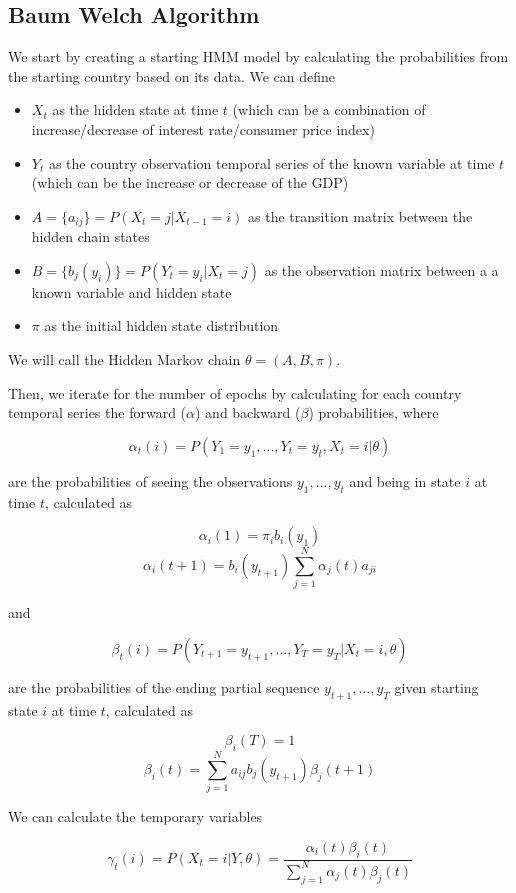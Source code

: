 \subsection*{Baum Welch Algorithm}
We start by creating a starting HMM model by calculating the probabilities from the starting country based on its data. We can define

\begin{itemize}
    \item $X_t$ as the hidden state at time $t$ (which can be a combination of increase/decrease of interest rate/consumer price index)
    \item $Y_t$ as the country observation temporal series of the known variable at time $t$ (which can be the increase or decrease of the GDP)
    \item $ A= \{a_{ij}\} = P(X_t = j | X_{t-1} = i)$ as the transition matrix between the hidden chain states
    \item $B = \{b_j(y_i)\} = P(Y_t = y_i | X_t = j)$ as the observation matrix between a a known variable and hidden state
    \item$\pi$ as the initial hidden state distribution
\end{itemize}
We will call the Hidden Markov chain \(\theta = (A,B,\pi)\).

Then, we iterate for the number of epochs by calculating for each country temporal series the forward ($\alpha$) and backward ($\beta$) probabilities, where

\[\alpha_t(i) = P(Y_1 = y_1, ..., Y_t = y_t, X_t = i | \theta)\]

are the probabilities of seeing the observations $y_1, ..., y_t$ and being in state $i$ at time $t$, calculated as

\[\alpha_i(1) = \pi_i b_i(y_1)\]
\[\alpha_i(t+1) = b_i(y_{t+1}) \sum_{j=1}^{N} \alpha_j(t) a_{ji}\]

and

\[\beta_t(i) = P(Y_{t+1} = y_{t+1}, ..., Y_T = y_T | X_t = i, \theta)\]

are the probabilities of the ending partial sequence $y_{t+1}, ..., y_T$ given starting state $i$ at time $t$, calculated as

\[\beta_i(T) = 1\]
\[\beta_i(t) = \sum_{j=1}^{N} a_{ij} b_j(y_{t+1}) \beta_j(t+1)\]

We can calculate the temporary variables

\[\gamma_t(i) = P(X_t = i | Y, \theta) = \frac{\alpha_i(t)\beta_i(t)}{\sum_{j=1}^{N} \alpha_j(t) \beta_j(t)}\]


